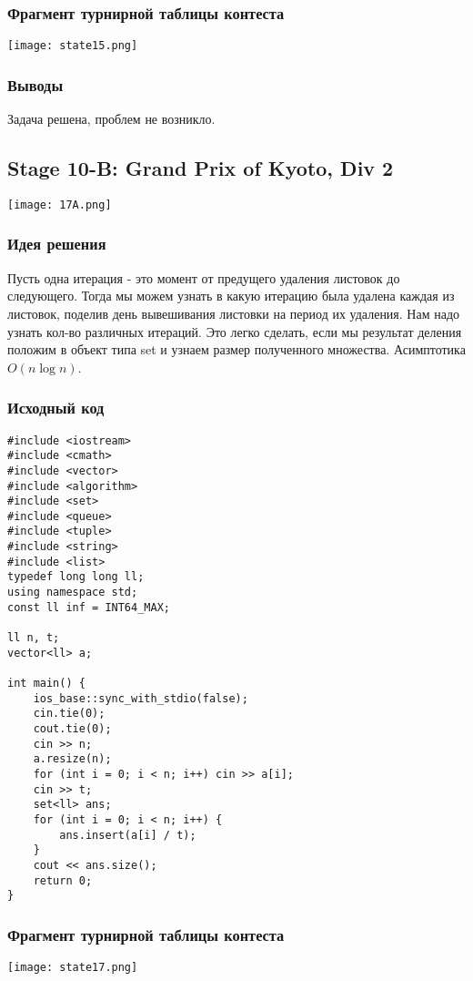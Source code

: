 \documentclass[12pt]{article}
\begin{document}
\subsubsection*{Фрагмент турнирной таблицы контеста}
\begin{center}
\texttt{[image: state15.png]}\newline\noindent
\end{center}

\subsubsection*{Выводы}
Задача решена, проблем не возникло. 
\subsection*{Stage 10-B: Grand Prix of Kyoto, Div 2}
\begin{center}
\texttt{[image: 17A.png]}
\end{center}
\subsubsection*{Идея решения}
Пусть одна итерация - это момент от предущего удаления листовок до следующего. Тогда мы можем узнать в какую итерацию была удалена каждая из листовок, поделив день вывешивания листовки на период их удаления. Нам надо узнать кол-во различных итераций. Это легко сделать, если мы результат деления положим в объект типа set и узнаем размер полученного множества. Асимптотика $O(n\log n)$.
\subsubsection*{Исходный код}
\begin{lstlisting}
#include <iostream>
#include <cmath>
#include <vector>
#include <algorithm>
#include <set>
#include <queue>
#include <tuple>
#include <string>
#include <list>
typedef long long ll;
using namespace std;
const ll inf = INT64_MAX;

ll n, t;
vector<ll> a;

int main() {
	ios_base::sync_with_stdio(false);
	cin.tie(0);
	cout.tie(0);
	cin >> n;
	a.resize(n);
	for (int i = 0; i < n; i++) cin >> a[i];
	cin >> t;
	set<ll> ans;
	for (int i = 0; i < n; i++) {
		ans.insert(a[i] / t);
	}
	cout << ans.size();
	return 0;
}
\end{lstlisting}
\subsubsection*{Фрагмент турнирной таблицы контеста}
\begin{center}
\texttt{[image: state17.png]}\newline\noindent
\end{center}
\end{document}
